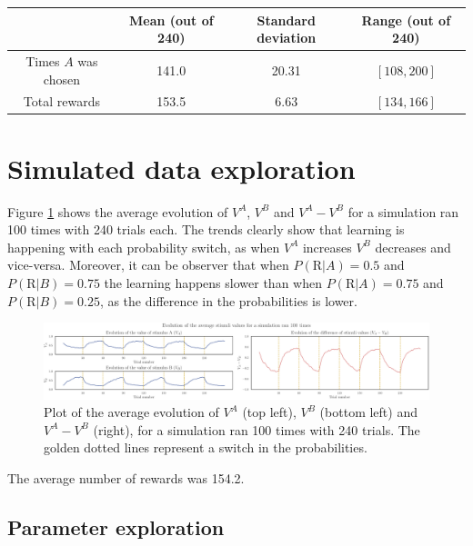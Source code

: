 \documentclass[12pt]{article}
\begin{document}
\begin{center}
 \begin{tabular}{|c || c | c | c|} 
 \hline
  & Mean (out of 240) & Standard deviation & Range (out of 240) \\ [0.5ex] 
 \hline\hline
 Times $A$ was chosen & 141.0 & 20.31 & $[108, 200]$ \\ 
 \hline
 Total rewards & 153.5 & 6.63 & $[134,166]$ \\ [1ex] 
 \hline
\end{tabular}
\end{center}

\section{Simulated data exploration}

Figure \ref{fig:2.2} shows the average evolution of $V^A$, $V^B$ and $V^A - V^B$ for a simulation ran 100 times with 240 trials each. The trends clearly show that learning is happening with each probability switch, as when $V^A$ increases $V^B$ decreases and vice-versa. Moreover, it can be observer that when $P(\mathrm{R} | A) = 0.5 $ and $P(\mathrm{R} | B) = 0.75$ the learning happens slower than when $P(\mathrm{R} | A) = 0.75 $ and $P(\mathrm{R} | B) = 0.25$, as the difference in the probabilities is lower.

\begin{figure}[h!]
	\centering
	\hspace*{-0.4in}
	\includegraphics[width=1\linewidth]{figures/2.2.pdf}
	\caption{Plot of the average evolution of $V^A$ (top left), $V^B$ (bottom left) and $V^A - V^B$ (right), for a simulation ran 100 times with 240 trials. The golden dotted lines represent a switch in the probabilities.}
	\label{fig:2.2}
\end{figure}

The average number of rewards was 154.2.

\subsection{Parameter exploration}






\end{document}
